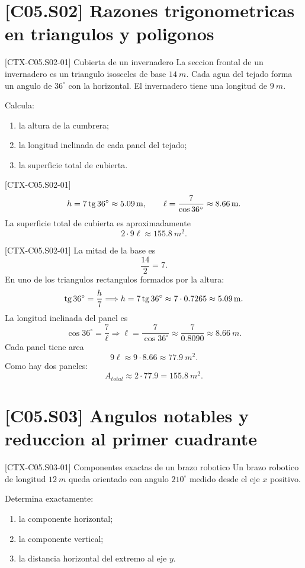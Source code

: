 \section{[C05.S02] Razones trigonometricas en triangulos y poligonos}

\begin{exercise}{[CTX-C05.S02-01] Cubierta de un invernadero}
La seccion frontal de un invernadero es un triangulo isosceles de base \(\SI{14}{m}\). Cada
agua del tejado forma un angulo de \(36^\circ\) con la horizontal. El invernadero tiene una
longitud de \(\SI{9}{m}\).

Calcula:
\begin{enumerate}
  \item la altura de la cumbrera;
  \item la longitud inclinada de cada panel del tejado;
  \item la superficie total de cubierta.
\end{enumerate}
\end{exercise}

\begin{shortanswer}{[CTX-C05.S02-01]}
\[
h=7\operatorname{tg} 36^\circ\approx \SI{5.09}{m},
\qquad
\ell=\frac{7}{\cos 36^\circ}\approx \SI{8.66}{m}.
\]
La superficie total de cubierta es aproximadamente
\[
2\cdot 9\ell \approx \SI{155.8}{m^2}.
\]
\end{shortanswer}

\begin{fullsolution}{[CTX-C05.S02-01]}
La mitad de la base es
\[
\frac{14}{2}=7.
\]
En uno de los triangulos rectangulos formados por la altura:
\[
\operatorname{tg} 36^\circ=\frac{h}{7}
\Longrightarrow
h=7\operatorname{tg} 36^\circ\approx 7\cdot 0.7265\approx \SI{5.09}{m}.
\]
La longitud inclinada del panel es
\[
\cos 36^\circ=\frac{7}{\ell}
\Longrightarrow
\ell=\frac{7}{\cos 36^\circ}\approx \frac{7}{0.8090}\approx \SI{8.66}{m}.
\]
Cada panel tiene area
\[
9\ell \approx 9\cdot 8.66\approx \SI{77.9}{m^2}.
\]
Como hay dos paneles:
\[
A_{total}\approx 2\cdot 77.9=\SI{155.8}{m^2}.
\]
\end{fullsolution}

\section{[C05.S03] Angulos notables y reduccion al primer cuadrante}

\begin{exercise}{[CTX-C05.S03-01] Componentes exactas de un brazo robotico}
Un brazo robotico de longitud \(\SI{12}{m}\) queda orientado con angulo \(210^\circ\) medido
desde el eje \(x\) positivo.

Determina exactamente:
\begin{enumerate}
  \item la componente horizontal;
  \item la componente vertical;
  \item la distancia horizontal del extremo al eje \(y\).
\end{enumerate}
\end{exercise}

